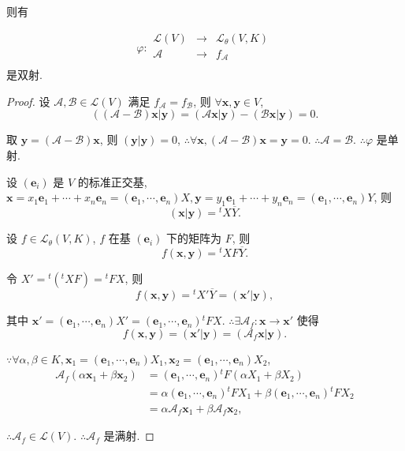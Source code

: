 \documentclass{ctexart}
\begin{document}
则有
\begin{theorem}\label{t3.1}
    \[\varphi:\begin{array}{rcl}
        \mathcal{L}(V) & \to & \mathcal{L}_\theta(V,K) \\
        \mathcal{A} & \to & f_\mathcal{A} \\
    \end{array}\]
    是双射.
\end{theorem}
\begin{proof}
    设 $\mathcal{A},\mathcal{B}\in\mathcal{L}(V)$ 满足 $f_\mathcal{A}=f_\mathcal{B}$, 则 $\forall\boldsymbol{x},\boldsymbol{y}\in V$,
    \[((\mathcal{A}-\mathcal{B})\boldsymbol{x}|\boldsymbol{y})=(\mathcal{A}\boldsymbol{x}|\boldsymbol{y})-(\mathcal{B}\boldsymbol{x}|\boldsymbol{y})=0.\]

    取 $\boldsymbol{y}=(\mathcal{A}-\mathcal{B})\boldsymbol{x}$, 则 $(\boldsymbol{y}|\boldsymbol{y})=0$, $\therefore\forall\boldsymbol{x},(\mathcal{A}-\mathcal{B})\boldsymbol{x}=\boldsymbol{y}=0$. $\therefore\mathcal{A}=\mathcal{B}$. $\therefore\varphi$ 是单射.

    设 $(\boldsymbol{e}_i)$ 是 $V$ 的标准正交基, $\boldsymbol{x}=x_1\boldsymbol{e}_1+\cdots+x_n\boldsymbol{e}_n=(\boldsymbol{e}_1,\cdots,\boldsymbol{e}_n)X,\boldsymbol{y}=y_1\boldsymbol{e}_1+\cdots+y_n\boldsymbol{e}_n=(\boldsymbol{e}_1,\cdots,\boldsymbol{e}_n)Y$, 则
    \[(\boldsymbol{x}|\boldsymbol{y})={}^tX\overline{Y}.\]

    设 $f\in\mathcal{L}_\theta(V,K)$, $f$ 在基 $(\boldsymbol{e}_i)$ 下的矩阵为 $F$, 则
    \begin{equation}\label{eq3.1}
        f(\boldsymbol{x},\boldsymbol{y})={}^tXF\overline{Y}.
    \end{equation}

    令 $X'={}^t({}^tXF)={}^tFX$, 则
    \[f(\boldsymbol{x},\boldsymbol{y})={}^tX'\overline{Y}=(\boldsymbol{x}'|\boldsymbol{y}),\]

    其中 $\boldsymbol{x}'=(\boldsymbol{e}_1,\cdots,\boldsymbol{e}_n)X'=(\boldsymbol{e}_1,\cdots,\boldsymbol{e}_n){}^tFX$. $\therefore\exists\mathcal{A}_f:\boldsymbol{x}\to\boldsymbol{x}'$ 使得
    \begin{equation}\label{eq3.2}
        f(\boldsymbol{x},\boldsymbol{y})=(\boldsymbol{x}'|\boldsymbol{y})=(\mathcal{A}_f\boldsymbol{x}|\boldsymbol{y}).
    \end{equation}

    $\because\forall\alpha,\beta\in K,\boldsymbol{x}_1=(\boldsymbol{e}_1,\cdots,\boldsymbol{e}_n)X_1,\boldsymbol{x}_2=(\boldsymbol{e}_1,\cdots,\boldsymbol{e}_n)X_2$,
    \begin{align*}
        \mathcal{A}_f(\alpha\boldsymbol{x}_1+\beta\boldsymbol{x}_2) & =(\boldsymbol{e}_1,\cdots,\boldsymbol{e}_n){}^tF(\alpha X_1+\beta X_2) \\
        & =\alpha(\boldsymbol{e}_1,\cdots,\boldsymbol{e}_n){}^tFX_1+\beta(\boldsymbol{e}_1,\cdots,\boldsymbol{e}_n){}^tFX_2 \\
        & =\alpha\mathcal{A}_f\boldsymbol{x}_1+\beta\mathcal{A}_f\boldsymbol{x}_2,
    \end{align*}

    $\therefore\mathcal{A}_f\in\mathcal{L}(V)$. $\therefore\mathcal{A}_f$ 是满射.
\end{proof}
\end{document}
